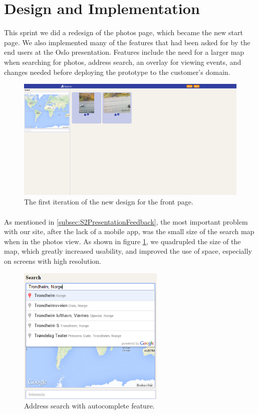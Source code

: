 \section{Design and Implementation}
\label{sec:S5DesignImpl}

This sprint we did a redesign of the photos page, which became the new start page. We also implemented many of the features that had been asked for by the end users at the Oslo presentation. Features include the need for a larger map when searching for photos, address search, an overlay for viewing events, and changes needed before deploying the prototype to the customer's domain.

\begin{figure}[ht!]
  \centering
  \includegraphics[width=\linewidth]{./img/webpage/27Oct/Frontpage27Oct}
  \caption{The first iteration of the new design for the front page.}
  \label{fig:S5DesignImplFront27Oct}
\end{figure}

\paragraph{} As mentioned in \ref{subsec:S2PresentationFeedback}, the most important problem with our site, after the lack of a mobile app, was the small size of the search map when in the photos view. As shown in figure \ref{fig:S5DesignImplFront27Oct}, we quadrupled the size of the map, which greatly increased usability, and improved the use of space, especially on screens with high resolution.

\begin{figure}[ht!]
  \centering
  \includegraphics[width=70mm]{./img/webpage/27Oct/AddressAutocomplete.png}
  \caption{Address search with autocomplete feature.}
  \label{fig:S5DesignImplAddressAuto}
\end{figure}

